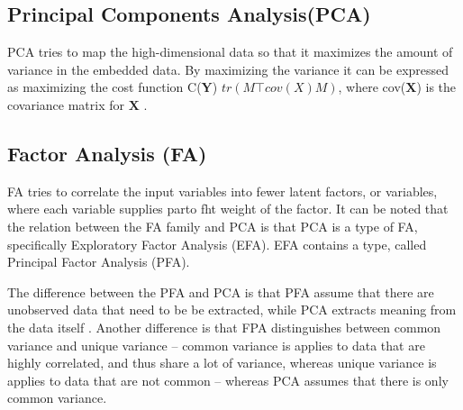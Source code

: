 \subsection{Principal Components Analysis(PCA)}\label{subsection:PCA}
PCA tries to map the high-dimensional data so that it maximizes the amount of variance in the embedded data. By maximizing the variance it can be expressed as maximizing the cost function C($\mathbf{Y}$) $tr(M\top cov(X)M)$, where cov($\mathbf{X}$) is the covariance matrix for $\mathbf{X}$ \cite{dimensionality-reduction-comparative-review}.


\begin{comment}
@misc{dimensionality-reduction-comparative-review,
organization = {Tilburg centre for Creative Computing},
url          = {https://lvdmaaten.github.io/publications/papers/TR\_Dimensionality\_Reduction\_Review\_2009.pdf},
title        = {Dimensionality Reduction: A Comparative Review},
author       = {Laurens van der Maaten, Eric Postma, Jaap van Henrik},
urldate      = {2009-10-26}
    }
\end{comment}
    

\subsection{Factor Analysis (FA)}\label{subsection:FA}
FA tries to correlate the input variables into fewer latent factors, or variables, where each variable supplies parto fht weight of the factor. It can be noted that the relation between the FA family and PCA is that PCA is a type of FA, specifically Exploratory Factor Analysis (EFA). EFA contains a type, called Principal Factor Analysis (PFA).

The difference between the PFA and PCA is that PFA assume that there are unobserved data that need to be be extracted, while PCA extracts meaning from the data itself \cite{factor-analysis-introduction}. Another difference is that FPA distinguishes between common variance and unique variance -- common variance is applies to data that are highly correlated, and thus share a lot of variance, whereas unique variance is applies to data that are not common -- whereas PCA assumes that there is only common variance. 


\begin{comment}
@misc{factor-analysis-introduction,
      organization = {Advanced Research Computing Statistical Methods and Data Analytics},
      url          = {https://stats.oarc.ucla.edu/spss/seminars/introduction-to-factor-analysis/a-practical-introduction-to-factor-analysis/},
      title        = {A PRACTICAL INTRODUCTION TO FACTOR ANALYSIS: EXPLORATORY FACTOR ANALYSIS},
      urldate      = {2022-10-11}
    }
\end{comment}

